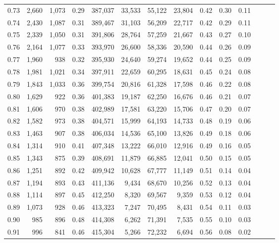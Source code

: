 \begin{tabular}{rrrrrrrrrrrrrr}
0.73 &  2,660 &  1,073 &  0.29 &  387,037 &   33,533 &  55,122 &  23,804 &  0.42 &  0.30 &      0.11 \\
0.74 &  2,430 &  1,087 &  0.31 &  389,467 &   31,103 &  56,209 &  22,717 &  0.42 &  0.29 &      0.11 \\
0.75 &  2,339 &  1,050 &  0.31 &  391,806 &   28,764 &  57,259 &  21,667 &  0.43 &  0.27 &      0.10 \\
0.76 &  2,164 &  1,077 &  0.33 &  393,970 &   26,600 &  58,336 &  20,590 &  0.44 &  0.26 &      0.09 \\
0.77 &  1,960 &    938 &  0.32 &  395,930 &   24,640 &  59,274 &  19,652 &  0.44 &  0.25 &      0.09 \\
0.78 &  1,981 &  1,021 &  0.34 &  397,911 &   22,659 &  60,295 &  18,631 &  0.45 &  0.24 &      0.08 \\
0.79 &  1,843 &  1,033 &  0.36 &  399,754 &   20,816 &  61,328 &  17,598 &  0.46 &  0.22 &      0.08 \\
0.80 &  1,629 &    922 &  0.36 &  401,383 &   19,187 &  62,250 &  16,676 &  0.46 &  0.21 &      0.07 \\
0.81 &  1,606 &    970 &  0.38 &  402,989 &   17,581 &  63,220 &  15,706 &  0.47 &  0.20 &      0.07 \\
0.82 &  1,582 &    973 &  0.38 &  404,571 &   15,999 &  64,193 &  14,733 &  0.48 &  0.19 &      0.06 \\
0.83 &  1,463 &    907 &  0.38 &  406,034 &   14,536 &  65,100 &  13,826 &  0.49 &  0.18 &      0.06 \\
0.84 &  1,314 &    910 &  0.41 &  407,348 &   13,222 &  66,010 &  12,916 &  0.49 &  0.16 &      0.05 \\
0.85 &  1,343 &    875 &  0.39 &  408,691 &   11,879 &  66,885 &  12,041 &  0.50 &  0.15 &      0.05 \\
0.86 &  1,251 &    892 &  0.42 &  409,942 &   10,628 &  67,777 &  11,149 &  0.51 &  0.14 &      0.04 \\
0.87 &  1,194 &    893 &  0.43 &  411,136 &    9,434 &  68,670 &  10,256 &  0.52 &  0.13 &      0.04 \\
0.88 &  1,114 &    897 &  0.45 &  412,250 &    8,320 &  69,567 &   9,359 &  0.53 &  0.12 &      0.04 \\
0.89 &  1,073 &    928 &  0.46 &  413,323 &    7,247 &  70,495 &   8,431 &  0.54 &  0.11 &      0.03 \\
0.90 &    985 &    896 &  0.48 &  414,308 &    6,262 &  71,391 &   7,535 &  0.55 &  0.10 &      0.03 \\
0.91 &    996 &    841 &  0.46 &  415,304 &    5,266 &  72,232 &   6,694 &  0.56 &  0.08 &      0.02 \\

\end{tabular}
